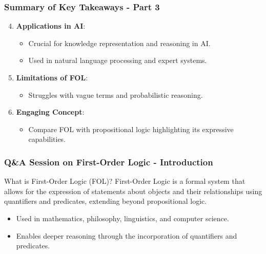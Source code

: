 \documentclass[aspectratio=169]{beamer}
\begin{document}
\begin{frame}[fragile]
    \frametitle{Summary of Key Takeaways - Part 3}
    \begin{enumerate}
        \setcounter{enumi}{3} %
        \item \textbf{Applications in AI}:
        \begin{itemize}
            \item Crucial for knowledge representation and reasoning in AI.
            \item Used in natural language processing and expert systems.
        \end{itemize}
        
        \item \textbf{Limitations of FOL}:
        \begin{itemize}
            \item Struggles with vague terms and probabilistic reasoning.
        \end{itemize}
        
        \item \textbf{Engaging Concept}:
        \begin{itemize}
            \item Compare FOL with propositional logic highlighting its expressive capabilities.
        \end{itemize}
    \end{enumerate}
\end{frame}

\begin{frame}[fragile]
    \frametitle{Q\&A Session on First-Order Logic - Introduction}
    \begin{block}{What is First-Order Logic (FOL)?}
        First-Order Logic is a formal system that allows for the expression of statements about objects and their relationships using quantifiers and predicates, extending beyond propositional logic.
    \end{block}
    
    \begin{itemize}
        \item Used in mathematics, philosophy, linguistics, and computer science.
        \item Enables deeper reasoning through the incorporation of quantifiers and predicates.
    \end{itemize}
\end{frame}
\end{document}
